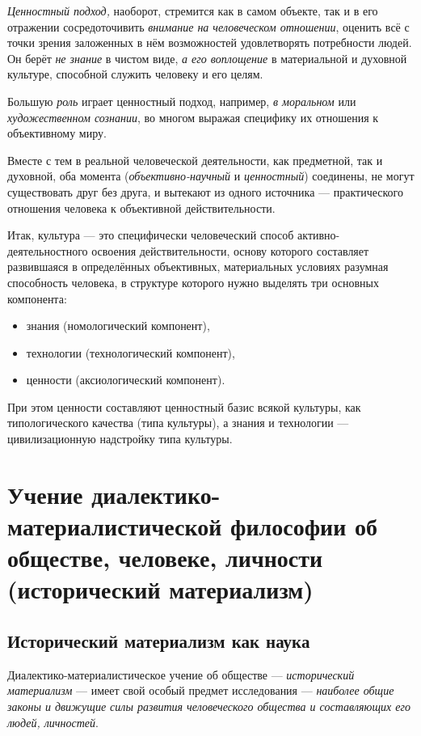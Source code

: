 \documentclass[a4paper,14pt,russian]{extreport}
\begin{document}
\emph{Ценностный подход,} наоборот, стремится как в самом объекте, так и в его отражении сосредоточивить \emph{внимание на человеческом отношении}, оценить всё с точки зрения заложенных в нём возможностей удовлетворять потребности людей. Он берёт \emph{не знание} в чистом виде, \emph{а его воплощение} в материальной и духовной культуре, способной служить человеку и его целям.

Большую \emph{роль} играет ценностный подход, например, \emph{в моральном} или \emph{художественном сознании}, во многом выражая специфику их отношения к объективному миру.

Вместе с тем в реальной человеческой деятельности, как предметной, так и духовной, оба момента (\emph{объективно-научный} и \emph{ценностный}) соединены, не могут существовать друг без друга, и вытекают из одного источника --- практического отношения человека к объективной действительности.

Итак, культура --- это специфически человеческий способ активно-деятельностного освоения действительности, основу которого составляет развившаяся в определённых объективных, материальных условиях разумная способность человека, в структуре которого нужно выделять три основных компонента:
\begin{itemize}
\item знания (номологический компонент),
\item технологии (технологический компонент),
\item ценности (аксиологический компонент).
\end{itemize}

При этом ценности составляют ценностный базис всякой культуры, как типологического качества (типа культуры), а знания и технологии --- цивилизационную надстройку типа культуры.

\chapter{Учение диалектико-материалистической философии об обществе, человеке, личности (исторический материализм)}

\section{Исторический материализм как наука}

Диалектико-материалистическое учение об обществе --- \emph{исторический материализм} --- имеет свой особый предмет исследования --- \emph{наиболее общие законы и движущие силы развития человеческого общества и составляющих его людей, личностей}.
\end{document}

